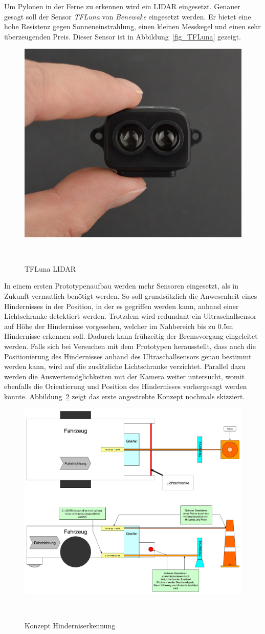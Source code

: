 \documentclass[main.tex]{subfiles} %
\begin{document}
Um Pylonen in der Ferne zu erkennen wird ein LIDAR eingesetzt. Genauer gesagt
soll der Sensor \textit{TFLuna} von \textit{Benewake} eingesetzt werden. Er
bietet eine hohe Resistenz gegen Sonneneinstrahlung, einen kleinen Messkegel
und einen sehr überzeugenden Preis. Dieser Sensor ist in
Abbildung~\ref{fig_TFLuna} gezeigt.

\begin{figure}[h!]
    \centering
    \includegraphics[width=0.25\linewidth]{./fig_Hinderniserkennung/TFLuna_Benewake.png}
    \caption{TFLuna LIDAR}~\label{fig:TFLuna}
\end{figure}

In einem ersten Prototypenaufbau werden mehr Sensoren eingesetzt, als in
Zukunft vermutlich benötigt werden. So soll grundsätzlich die Anwesenheit eines
Hindernisses in der Position, in der es gegriffen werden kann, anhand einer
Lichtschranke detektiert werden. Trotzdem wird redundant ein Ultraschallsensor
auf Höhe der Hindernisse vorgesehen, welcher im Nahbereich bis zu 0.5m
Hindernisse erkennen soll. Dadurch kann frühzeitig der Bremsvorgang eingeleitet
werden. Falls sich bei Versuchen mit dem Prototypen herausstellt, dass auch die
Positionierung des Hindernisses anhand des Ultraschallsensors genau bestimmt
werden kann, wird auf die zusätzliche Lichtschranke verzichtet. Parallel dazu
werden die Auswertemöglichkeiten mit der Kamera weiter untersucht, womit
ebenfalls die Orientierung und Position des Hindernisses vorhergesagt werden
könnte. Abbildung~\ref{fig:Hinderniserkennung} zeigt das erste angestrebte
Konzept nochmals skizziert.

\begin{figure}[h!]
    \centering
    \includegraphics[width=0.75\linewidth]{./fig_Hinderniserkennung/Konzept_Hinderniserkennung.pdf}
    \caption{Konzept Hinderniserkennung}~\label{fig:Hinderniserkennung}
\end{figure}
\end{document}
